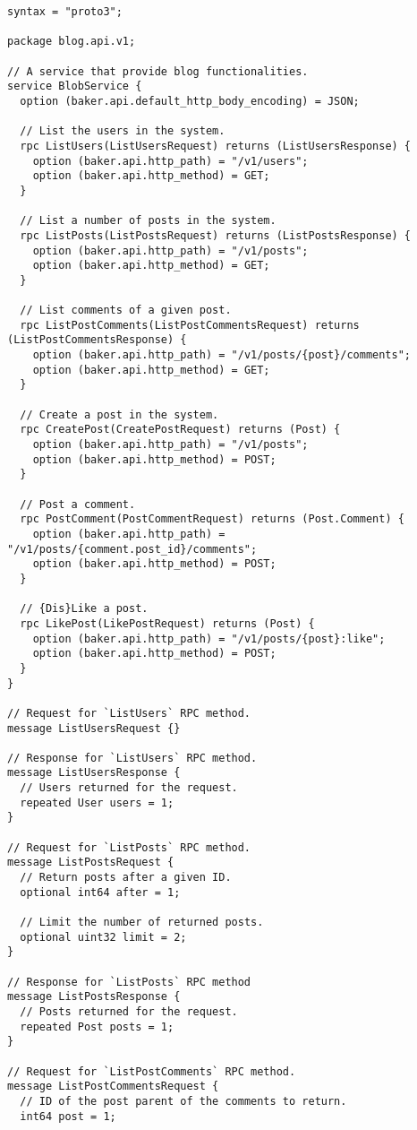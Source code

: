 \begin{verbatim}
syntax = "proto3";

package blog.api.v1;

// A service that provide blog functionalities.
service BlobService {
  option (baker.api.default_http_body_encoding) = JSON;

  // List the users in the system.
  rpc ListUsers(ListUsersRequest) returns (ListUsersResponse) {
    option (baker.api.http_path) = "/v1/users";
    option (baker.api.http_method) = GET;
  }

  // List a number of posts in the system.
  rpc ListPosts(ListPostsRequest) returns (ListPostsResponse) {
    option (baker.api.http_path) = "/v1/posts";
    option (baker.api.http_method) = GET;
  }

  // List comments of a given post.
  rpc ListPostComments(ListPostCommentsRequest) returns (ListPostCommentsResponse) {
    option (baker.api.http_path) = "/v1/posts/{post}/comments";
    option (baker.api.http_method) = GET;
  }

  // Create a post in the system.
  rpc CreatePost(CreatePostRequest) returns (Post) {
    option (baker.api.http_path) = "/v1/posts";
    option (baker.api.http_method) = POST;
  }

  // Post a comment.
  rpc PostComment(PostCommentRequest) returns (Post.Comment) {
    option (baker.api.http_path) = "/v1/posts/{comment.post_id}/comments";
    option (baker.api.http_method) = POST;
  }

  // {Dis}Like a post.
  rpc LikePost(LikePostRequest) returns (Post) {
    option (baker.api.http_path) = "/v1/posts/{post}:like";
    option (baker.api.http_method) = POST;
  }
}

// Request for `ListUsers` RPC method.
message ListUsersRequest {}

// Response for `ListUsers` RPC method.
message ListUsersResponse {
  // Users returned for the request.
  repeated User users = 1;
}

// Request for `ListPosts` RPC method.
message ListPostsRequest {
  // Return posts after a given ID.
  optional int64 after = 1;

  // Limit the number of returned posts.
  optional uint32 limit = 2;
}

// Response for `ListPosts` RPC method
message ListPostsResponse {
  // Posts returned for the request.
  repeated Post posts = 1;
}

// Request for `ListPostComments` RPC method.
message ListPostCommentsRequest {
  // ID of the post parent of the comments to return.
  int64 post = 1;


\end{verbatim}
